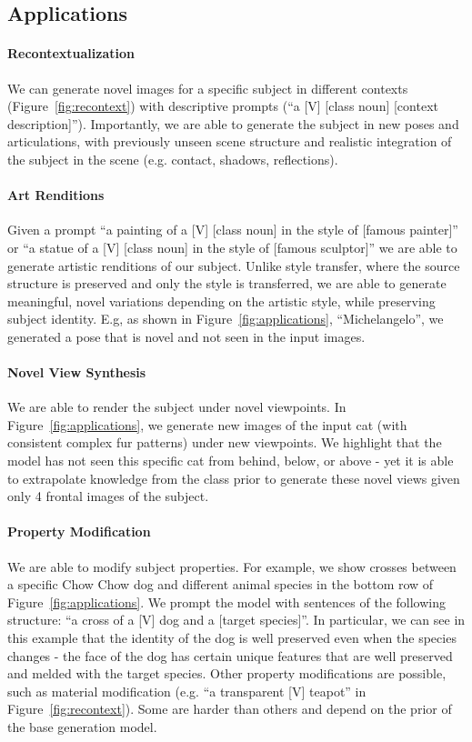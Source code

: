 \subsection{Applications}

\paragraph{Recontextualization}
We can generate novel images for a specific subject in different contexts (Figure~\ref{fig:recontext}) with descriptive prompts (``a [V] [class noun] [context description]''). Importantly, we are able to generate the subject in new poses and articulations, with previously unseen scene structure and realistic integration of the subject in the scene (e.g. contact, shadows, reflections). 

\paragraph{Art Renditions} Given a prompt ``a painting of a [V] [class noun] in the style of [famous painter]'' or ``a statue of a [V] [class noun] in the style of [famous sculptor]'' we are able to generate artistic renditions of our subject. Unlike style transfer, where the source structure is preserved and only the style is transferred, we are able to generate meaningful, novel variations depending on the artistic style, while preserving subject identity. E.g, as shown in Figure~\ref{fig:applications}, ``Michelangelo'', we generated a pose that is novel and not seen in the input images.

\paragraph{Novel View Synthesis} We are able to render the subject under novel viewpoints. In Figure~\ref{fig:applications}, we generate new images of the input cat (with consistent complex fur patterns) under new viewpoints. We highlight that the model has not seen this specific cat from behind, below, or above - yet it is able to extrapolate knowledge from the class prior to generate these novel views given only 4 frontal images of the subject.

\paragraph{Property Modification} We are able to modify subject properties. For example, we show crosses between a specific Chow Chow dog and different animal species in the bottom row of Figure~\ref{fig:applications}. We prompt the model with sentences of the following structure: ``a cross of a [V] dog and a [target species]''. In particular, we can see in this example that the identity of the dog is well preserved even when the species changes - the face of the dog has certain unique features that are well preserved and melded with the target species. Other property modifications are possible, such as material modification (e.g. ``a transparent [V] teapot'' in Figure~\ref{fig:recontext}). Some are harder than others and depend on the prior of the base generation model.

